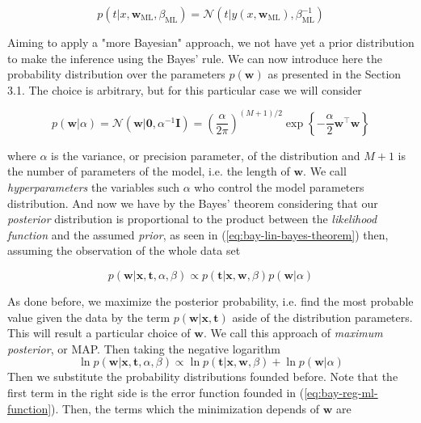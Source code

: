 \documentclass[11pt]{article} %
\begin{document}
\begin{equation}
   p\left(t | x, \mathbf{w}_{\mathrm{ML}}, \beta_{\mathrm{ML}}\right)=\mathcal{N}\left(t | y\left(x, \mathbf{w}_{\mathrm{ML}}\right), \beta_{\mathrm{ML}}^{-1}\right)
\end{equation}

Aiming to apply a "more Bayesian" approach, we not have yet a prior distribution to make the inference using the Bayes' rule. We can now introduce here the probability distribution over the parameters $p(\mathbf{w})$ as presented in the Section 3.1. The choice is arbitrary, but for this particular case we will consider

\begin{equation}
   \label{eq:bay-lin-reg-prior-dist}
   p(\mathbf{w} | \alpha)=\mathcal{N}\left(\mathbf{w} | \mathbf{0}, \alpha^{-1} \mathbf{I}\right)=\left(\frac{\alpha}{2 \pi}\right)^{(M+1) / 2} \exp \left\{-\frac{\alpha}{2} \mathbf{w}^\top \mathbf{w}\right\}
\end{equation}

where $\alpha$ is the variance, or precision parameter, of the distribution and $M+1$ is the number of parameters of the model, i.e. the length of $\mathbf{w}$. We call \textit{hyperparameters} the variables such $\alpha$ who control the model parameters distribution. And now we have by the Bayes' theorem considering that our \textit{posterior} distribution is proportional to the product between the \textit{likelihood function} and the assumed \textit{prior}, as seen in (\ref{eq:bay-lin-bayes-theorem}) then, assuming the observation of the whole data set

\begin{equation}
   p(\mathbf{w} | \mathbf{x}, \mathbf{t}, \alpha, \beta) \propto p(\mathbf{t} | \mathbf{x}, \mathbf{w}, \beta) p(\mathbf{w} | \alpha)
\end{equation}

As done before, we maximize the posterior probability, i.e. find the most probable value given the data by the term $p(\mathbf{w} | \mathbf{x}, \mathbf{t}) $ aside of the distribution parameters. This will result a particular choice of $\mathbf{w}$. We call this approach of \textit{maximum posterior}, or MAP. Then taking the negative logarithm
%
\begin{equation}
   \ln p(\mathbf{w} | \mathbf{x}, \mathbf{t}, \alpha, \beta) \propto \ln p(\mathbf{t} | \mathbf{x}, \mathbf{w}, \beta) + \ln p(\mathbf{w} | \alpha)
\end{equation}
%
Then we substitute the probability distributions founded before. Note that the first term in the right side is the error function founded in (\ref{eq:bay-reg-ml-function}). Then, the terms which the minimization depends of $\mathbf{w}$ are
\end{document}
